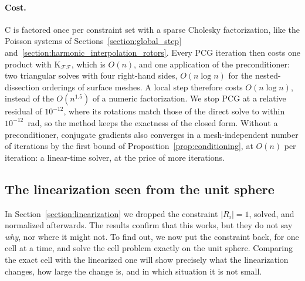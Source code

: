 \documentclass{birkjour}
\theoremstyle{remark}
\numberwithin{equation}{section}
\begin{document}
\paragraph{Cost.} $\mathrm C$ is factored once per constraint set with a sparse Cholesky factorization, like the Poisson systems of Sections~\ref{section:global_step} and~\ref{section:harmonic_interpolation_rotors}. Every PCG iteration then costs one product with $\mathrm K_{\mathcal F \mathcal F}$, which is $O(n)$, and one application of the preconditioner: two triangular solves with four right-hand sides, $O(n \log n)$ for the nested-dissection orderings of surface meshes. A local step therefore costs $O(n \log n)$, instead of the $O(n^{1.5})$ of a numeric factorization. We stop PCG at a relative residual of $10^{-12}$, where its rotations match those of the direct solve to within $10^{-12}$~rad, so the method keeps the exactness of the closed form. Without a preconditioner, conjugate gradients also converges in a mesh-independent number of iterations by the first bound of Proposition~\ref{prop:conditioning}, at $O(n)$ per iteration: a linear-time solver, at the price of more iterations.

\subsection{The linearization seen from the unit sphere}
\label{section:exact_cell}

In Section~\ref{section:linearization} we dropped the constraint $|R_i| = 1$, solved, and normalized afterwards. The results confirm that this works, but they do not say \emph{why}, nor where it might not. To find out, we now put the constraint back, for one cell at a time, and solve the cell problem exactly on the unit sphere. Comparing the exact cell with the linearized one will show precisely what the linearization changes, how large the change is, and in which situation it is not small.
\end{document}
